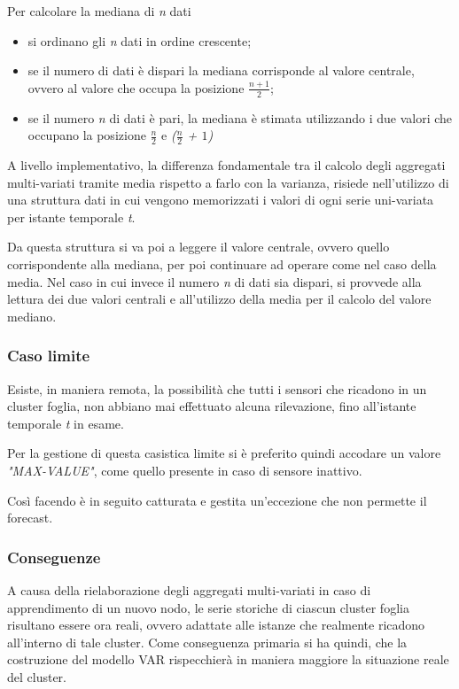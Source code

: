 \documentclass[12pt,a4paper,twoside,openright]{book}
\begin{document}
Per calcolare la mediana di \textit{n} dati \cite{15a} 
\begin{itemize}
\item si ordinano gli \textit{n} dati in ordine crescente;
\item se il numero di dati è dispari la mediana corrisponde al valore centrale, ovvero al valore che occupa la posizione \textbf{$\frac{n+1}{2}$};
\item se il numero \textit{n} di dati è pari, la mediana è stimata utilizzando i due valori che occupano la posizione \textit{$\frac{n}{2}$} e \textit{($\frac{n}{2}$ + $1$)}
\end{itemize}

A livello implementativo, la differenza fondamentale tra il calcolo degli aggregati multi-variati tramite media rispetto a farlo con la varianza, risiede nell'utilizzo di una struttura dati in cui vengono memorizzati i valori di ogni serie uni-variata per istante temporale \textit{t}.

Da questa struttura si va poi a leggere il valore centrale, ovvero quello corrispondente alla mediana, per poi continuare ad operare come nel caso della media. Nel caso in cui invece il numero \textit{n} di dati sia dispari, si provvede alla lettura dei due valori centrali e all'utilizzo della media per il calcolo del valore mediano.

\subsubsection{Caso limite}
Esiste, in maniera remota, la possibilità che tutti i sensori che ricadono in un cluster foglia, non abbiano mai effettuato alcuna rilevazione, fino all'istante temporale \textit{t} in esame. 

Per la gestione di questa casistica limite si è preferito quindi accodare un valore \textit{"MAX-VALUE"}, come quello presente in caso di sensore inattivo.

Così facendo è in seguito catturata e gestita un'eccezione che non permette il forecast.


\subsubsection{Conseguenze}
A causa della rielaborazione degli aggregati multi-variati in caso di apprendimento di un nuovo nodo, le serie storiche di ciascun cluster foglia risultano essere ora reali, ovvero adattate alle istanze che realmente ricadono all'interno di tale cluster. Come conseguenza primaria si ha quindi, che la costruzione del modello VAR rispecchierà in maniera maggiore la situazione reale del cluster.
\end{document}
